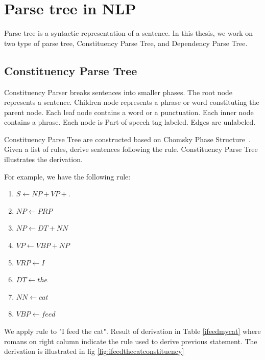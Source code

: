 

\section{Parse tree in NLP}
Parse tree is a syntactic representation of a sentence. In this thesis, we work on two type of parse tree, Constituency Parse Tree, and Dependency Parse Tree.
\subsection{Constituency Parse Tree}
Constituency Parser breaks sentences into smaller phases. The root node represents a sentence. Children node represents a phrase or word constituting the parent node. 
Each leaf node contains a word or a punctuation. Each inner node contains a phrase. Each node is Part-of-speech tag labeled. Edges are unlabeled.

Constituency Parse Tree are constructed based on Chomsky Phase Structure~\cite{chomsky2002syntactic}. Given a list of rules, derive sentences following the rule. Constituency Parse Tree illustrates the derivation.


For example, we have the following rule:
\begin{enumerate}[label=(\roman*)]
    \item $S \leftarrow NP + VP + .$
    \item $NP \leftarrow PRP $
    \item $NP \leftarrow DT + NN$
    \item $VP \leftarrow VBP + NP$
    \item $VRP \leftarrow I$
    \item $DT \leftarrow the$
    \item $NN \leftarrow cat$
    \item $VBP \leftarrow feed$
\end{enumerate}
We apply rule to "I feed the cat". Result of derivation in Table \ref{ifeedmycat}  where romans on right column indicate the rule used to derive previous statement. The derivation is illustrated in fig \ref{fig:ifeedthecatconstituency}


